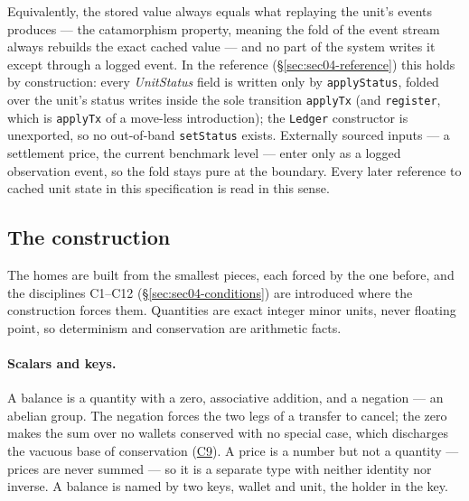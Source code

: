 Equivalently, the stored value always equals what replaying the unit's events produces ---
the catamorphism property, meaning the fold of the event stream always rebuilds the exact
cached value --- and no part of the system writes it except through a logged event. In the
reference (\S\ref{sec:sec04-reference}) this holds by construction: every
\emph{UnitStatus} field is written only by \texttt{applyStatus}, folded over the unit's
status writes inside the sole transition \texttt{applyTx} (and \texttt{register}, which is
\texttt{applyTx} of a move-less introduction); the
\texttt{Ledger} constructor is unexported, so no out-of-band \texttt{setStatus} exists.
Externally sourced inputs --- a settlement price, the current benchmark level --- enter
only as a logged observation event, so the fold stays pure at the boundary. Every later
reference to cached unit state in this specification is read in this sense.

\subsection{The construction}
\label{sec:sec04-construction}

The homes are built from the smallest pieces, each forced by the one before, and the
disciplines C1--C12 (\S\ref{sec:sec04-conditions}) are introduced where the construction
forces them. Quantities are exact integer minor units, never floating point, so
determinism and conservation are arithmetic facts.

\paragraph{Scalars and keys.}
A balance is a quantity with a zero, associative addition, and a negation --- an abelian
group. The negation forces the two legs of a transfer to cancel; the zero makes the
sum over no wallets conserved with no special case, which discharges the vacuous base of
conservation (\hyperref[cond:C9]{C9}). A price is a number but not a quantity --- prices
are never summed --- so it is a separate type with neither identity nor inverse. A balance
is named by two keys, wallet and unit, the holder in the key.

